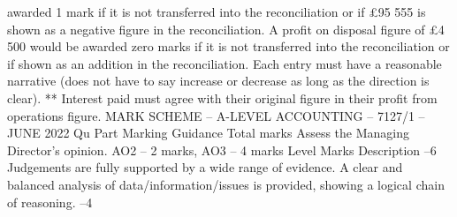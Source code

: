 \documentclass{article}
\begin{document}
awarded 1 mark if it is not transferred into the reconciliation or if £95 555 is shown as a negative figure in \newline
the reconciliation. A profit on disposal figure of £4 500 would be awarded zero marks if it is not \newline
transferred into the reconciliation or if shown as an addition in the reconciliation. \newline
 \newline
Each entry must have a reasonable narrative (does not have to say increase or decrease as long as the \newline
direction is clear).   \newline
 \newline
** Interest paid must agree with their original figure in their profit from operations figure.  \newline
 \newline
 \newline
 \newline
 \newline
MARK SCHEME – A-LEVEL ACCOUNTING – 7127/1 – JUNE 2022  \newline
Qu \newline
Part \newline
Marking Guidance \newline
Total \newline
marks   \newline
Assess the Managing Director’s opinion.   \newline
 \newline
AO2 – 2 marks, AO3 – 4 marks \newline
 \newline
Level \newline
Marks \newline
Description  –6 \newline
Judgements are fully supported by a wide range of evidence.  A clear and balanced \newline
analysis of data/information/issues is provided, showing a logical chain of reasoning.  –4 \newline
\end{document}

